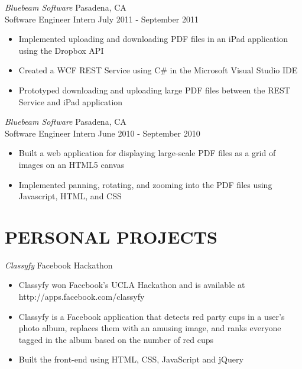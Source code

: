 \documentclass{res}
\begin{document}
\begin{resume}
 {\sl Bluebeam Software} \hfill Pasadena, CA \\[2pt]
 Software Engineer Intern \hfill    July 2011 - September 2011

   \begin{itemize} \itemsep -2pt
   \item  Implemented uploading and downloading PDF files in an iPad application using the Dropbox API
   \item Created a WCF REST Service using C\# in the Microsoft Visual Studio IDE
   \item Prototyped downloading and uploading large PDF files between the REST Service and iPad application
   \end{itemize} \vspace{-6pt}


 {\sl Bluebeam Software} \hfill Pasadena, CA \\[2pt]
 Software Engineer Intern \hfill    June 2010 - September 2010

   \begin{itemize} \itemsep -2pt
   \item  Built a web application for displaying large-scale PDF files as a grid of images on an HTML5 canvas
   \item Implemented panning, rotating, and zooming into the PDF files using Javascript, HTML, and CSS
   \end{itemize} \vspace{-6pt}

\section{PERSONAL PROJECTS}
\vspace{8pt}

 {\sl Classyfy} \hfill Facebook Hackathon

   \begin{itemize} \itemsep -2pt
   \item  Classyfy won Facebook’s UCLA Hackathon and is available at http://apps.facebook.com/classyfy
   \item Classyfy is a Facebook application that detects red party cups in a user’s photo album, replaces them with an amusing image, and ranks everyone tagged in the album based on the number of red cups
    \item Built the front-end using HTML, CSS, JavaScript and jQuery
    \end{itemize} \vspace{-6pt}


\end{resume}
\end{document}
